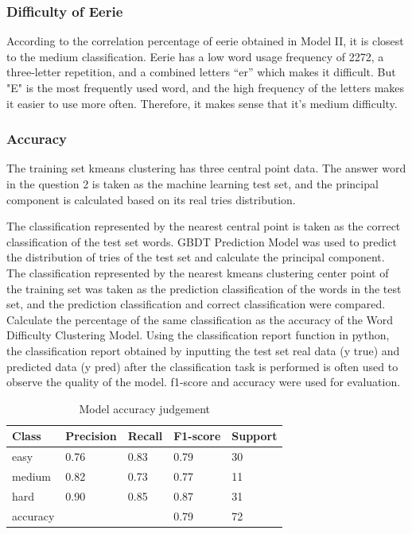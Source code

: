 \documentclass[
  journal=medium,
  manuscript=Report,
  year=2023,
  volume=37,
]{cup-journal}
\begin{document}
\subsubsection{Difficulty of Eerie}

According to the correlation percentage of eerie obtained in Model II, it is closest to the medium classification. Eerie has a low word usage frequency of 2272, a three-letter repetition, and a combined letters “er” which makes it difficult. But "E" is the most frequently used word, and the high frequency of the letters makes it easier to use more often. Therefore, it makes sense that it's medium difficulty.

\subsubsection{Accuracy}

The training set kmeans clustering has three central point data. The answer word in the question 2 is taken as the machine learning test set, and the principal component is calculated based on its real tries distribution. 

The classification represented by the nearest central point is taken as the correct classification of the test set words. GBDT Prediction Model was used to predict the distribution of tries of the test set and calculate the principal component. The classification represented by the nearest kmeans clustering center point of the training set was taken as the prediction classification of the words in the test set, and the prediction classification and correct classification were compared. Calculate the percentage of the same classification as the accuracy of the Word Difficulty Clustering Model. Using the classification report function in python, the classification report obtained by inputting the test set real data (y true) and predicted data (y pred) after the classification task is performed is often used to observe the quality of the model. f1-score and accuracy were used for evaluation.

\begin{table}[hbt!]
    \begin{threeparttable}
    \caption{Model accuracy judgement}
    \label{accuracy}
    \begin{tabular}{lllll}
    \toprule
    \headrow Class & Precision  & Recall & F1-score & Support\\ 
    \midrule
    easy & 0.76 & 0.83 & 0.79 & 30 \\ 
    \midrule
    medium & 0.82 & 0.73 & 0.77 & 11 \\ 
    \midrule
    hard & 0.90 & 0.85 & 0.87 & 31 \\ 
    \midrule
    accuracy &  &  & 0.79 & 72 \\ 
    \bottomrule 
    \end{tabular}
    \end{threeparttable}
\end{table}
\end{document}
